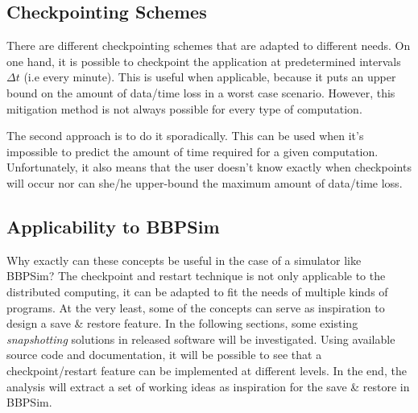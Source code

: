 {\subsection*{Checkpointing Schemes}
There are different checkpointing schemes that are adapted to different needs. On one hand, it is possible to checkpoint the application at predetermined intervals $\Delta t$ (i.e every minute). This is useful when applicable, because it puts an upper bound on the amount of data/time loss in a worst case scenario. However, this mitigation method is not always possible for every type of computation. 

The second approach is to do it sporadically. This can be used when it's impossible to predict the amount of time required for a given computation. Unfortunately, it also means that the user doesn't know exactly when checkpoints will occur nor can she/he upper-bound the maximum amount of data/time loss.

\subsection*{Applicability to BBPSim}
Why exactly can these concepts be useful in the case of a simulator like BBPSim? The checkpoint and restart technique is not only applicable to the distributed computing, it can be adapted to fit the needs of multiple kinds of programs. At the very least, some of the concepts can serve as inspiration to design a save \& restore feature. In the following sections, some existing \textit{snapshotting} solutions in released software will be investigated. Using available source code and documentation, it will be possible to see that a checkpoint/restart feature can be implemented at different levels. In the end, the analysis will extract a set of working ideas as inspiration for the save \& restore in BBPSim.





}